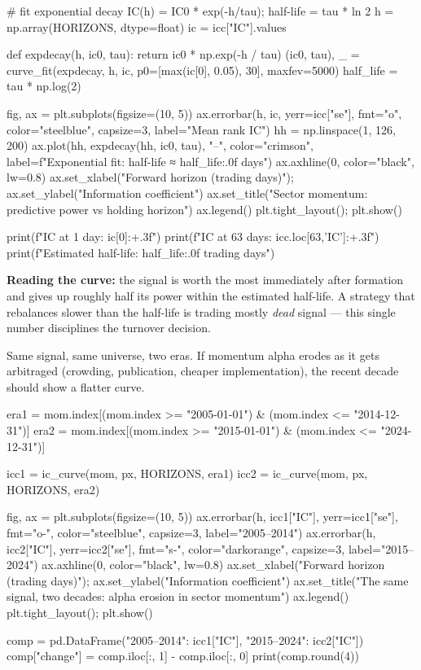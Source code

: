 \documentclass{pyportfolios-note}
\begin{document}
\begin{notecode}
# fit exponential decay IC(h) = IC0 * exp(-h/tau); half-life = tau * ln 2
h = np.array(HORIZONS, dtype=float)
ic = icc["IC"].values

def expdecay(h, ic0, tau): return ic0 * np.exp(-h / tau)
(ic0, tau), _ = curve_fit(expdecay, h, ic, p0=[max(ic[0], 0.05), 30], maxfev=5000)
half_life = tau * np.log(2)

fig, ax = plt.subplots(figsize=(10, 5))
ax.errorbar(h, ic, yerr=icc["se"], fmt="o", color="steelblue", capsize=3, label="Mean rank IC")
hh = np.linspace(1, 126, 200)
ax.plot(hh, expdecay(hh, ic0, tau), "--", color="crimson",
        label=f"Exponential fit: half-life ≈ {half_life:.0f} days")
ax.axhline(0, color="black", lw=0.8)
ax.set_xlabel("Forward horizon (trading days)"); ax.set_ylabel("Information coefficient")
ax.set_title("Sector momentum: predictive power vs holding horizon")
ax.legend()
plt.tight_layout(); plt.show()

print(f"IC at 1 day:  {ic[0]:+.3f}")
print(f"IC at 63 days: {icc.loc[63,'IC']:+.3f}")
print(f"Estimated half-life: {half_life:.0f} trading days")
\end{notecode}

\textbf{Reading the curve:} the signal is worth the most immediately after
formation and gives up roughly half its power within the estimated half-life. A
strategy that rebalances slower than the half-life is trading mostly
\textit{dead} signal — this single number disciplines the turnover decision.

\noteneedroom{150bp}

Same signal, same universe, two eras. If momentum alpha erodes as it gets
arbitraged (crowding, publication, cheaper implementation), the recent decade
should show a flatter curve.

\begin{notecode}
era1 = mom.index[(mom.index >= "2005-01-01") & (mom.index <= "2014-12-31")]
era2 = mom.index[(mom.index >= "2015-01-01") & (mom.index <= "2024-12-31")]

icc1 = ic_curve(mom, px, HORIZONS, era1)
icc2 = ic_curve(mom, px, HORIZONS, era2)

fig, ax = plt.subplots(figsize=(10, 5))
ax.errorbar(h, icc1["IC"], yerr=icc1["se"], fmt="o-", color="steelblue", capsize=3, label="2005–2014")
ax.errorbar(h, icc2["IC"], yerr=icc2["se"], fmt="s-", color="darkorange", capsize=3, label="2015–2024")
ax.axhline(0, color="black", lw=0.8)
ax.set_xlabel("Forward horizon (trading days)"); ax.set_ylabel("Information coefficient")
ax.set_title("The same signal, two decades: alpha erosion in sector momentum")
ax.legend()
plt.tight_layout(); plt.show()

comp = pd.DataFrame({"2005–2014": icc1["IC"], "2015–2024": icc2["IC"]})
comp["change"] = comp.iloc[:, 1] - comp.iloc[:, 0]
print(comp.round(4))
\end{notecode}
\end{document}
